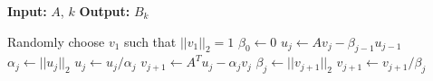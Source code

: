 \begin{algorithm}[H]
 \caption{\textsc{GKL}}
 \label{alg:GKL}
 \begin{algorithmic}[1]
 \State \textbf{Input:} $A$, $k$
 \State \textbf{Output:} $B_k$
 
\State Randomly choose $v_1$ such that $||v_1||_2=1$ 
\State $\beta_0\gets 0$ 
\State $u_j\gets Av_j - \beta_{j-1}u_{j-1}$
\State $\alpha_j\gets ||u_j||_2$
\State $u_j \gets u_j/\alpha_j$
\State $v_{j+1} \gets A^Tu_j-\alpha_jv_j$
\State $\beta_j\gets ||v_{j+1}||_2$
\State $v_{j+1}\gets v_{j+1}/\beta_j$
\EndFor

\end{algorithmic}
\end{algorithm}


